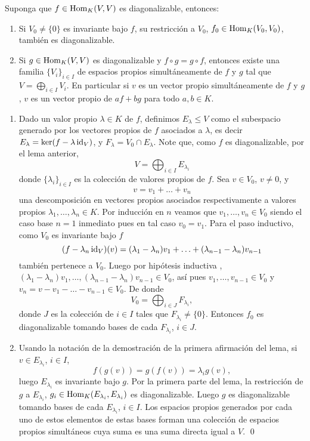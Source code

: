 \begin{lema}
Suponga que $f\in\operatorname{Hom}_K(V,V)$ es diagonalizable, entonces:
\begin{enumerate}
\item Si $V_0\ne\{0\}$ es invariante bajo $f$, su restricci\'on a $V_0$, $f_0\in\operatorname{Hom}_K(V_0,V_0)$, tambi\'en es diagonalizable. 
\item Si  $g\in\operatorname{Hom}_K(V,V)$ es diagonalizable y $f\circ g=g\circ f$, entonces existe una familia $\{V_i\}_{i\in I}$ de espacios propios simult\'aneamente de $f$ y $g$ tal que $V=\bigoplus_{i\in I}V_i$. En particular si $v$ es un vector propio simult\'aneamente de $f$ y $g$, $v$ es un vector propio de $af+bg$ para todo $a,b\in K$.
\end{enumerate}
\end{lema} 

\dem \begin{enumerate}
\item Dado un valor propio $\lambda\in K$ de $f$, definimos $E_\lambda\le V$ como el subespacio generado por los vectores propios de $f$ asociados a $\lambda$, es decir $E_\lambda=\ker(f-\lambda\operatorname{id}_V)$, y $F_\lambda=V_0\cap E_\lambda$. Note que, como $f$ es diagonalizable, por el lema anterior,
\[
V=\bigoplus_{i\in I} E_{\lambda_i}
\]
donde $\{\lambda_i\}_{i\in I}$ es la colecci\'on de valores propios de $f$. Sea $v\in V_0$, $v\ne 0$, y
\[
v=v_1+\ldots+v_n
\]
una descomposici\'on en vectores propios asociados respectivamente a valores propios $\lambda_1, \ldots , \lambda_n\in K$. Por inducci\'on en $n$ veamos que $v_1,\ldots,v_n\in V_0$ siendo el caso base $n=1$ inmediato pues en tal caso $v_0=v_1$. Para el paso inductivo, como $V_0$ es invariante bajo $f$
\[
(f-\lambda_n\operatorname{id}_V)(v)=(\lambda_1-\lambda_n)v_1+\ldots+(\lambda_{n-1}-\lambda_{n})v_{n-1}
\]
tambi\'en pertenece a $V_0$. Luego por hip\'otesis inductiva , $(\lambda_1-\lambda_n)v_1, \ldots, (\lambda_{n-1}-\lambda_{n})v_{n-1}\in V_0$, as\'i pues $v_1, \ldots, v_{n-1}\in V_0$ y $v_n=v-v_1-\ldots-v_{n-1}\in V_0$. De donde
\[
V_0=\bigoplus_{i\in J} F_{\lambda_i},
\]
donde $J$ es la colecci\'on de $i\in I$ tales que $F_{\lambda_i}\ne\{0\}$. Entonces $f_0$ es diagonalizable tomando bases de cada $F_{\lambda_i}$, $i\in J$.
\item Usando la notaci\'on de la demostraci\'on de la primera afirmaci\'on del lema, si $v\in E_{\lambda_i}$, $i\in I$,
\[
f\left(g(v)\right)=g\left(f(v)\right)=\lambda_ig(v),
\]
luego $E_{\lambda_i}$ es invariante bajo $g$. Por la primera parte del lema, la restricci\'on de $g$ a $E_{\lambda_i}$, $g_i\in\operatorname{Hom}_K (E_{\lambda_i},E_{\lambda_i})$ es diagonalizable. Luego $g$ es diagonalizable tomando bases de cada $E_{\lambda_i}$, $i\in I$. Los espacios propios generados por cada uno de estos elementos de estas bases forman una colecci\'on de espacios propios simult\'aneos cuya suma es una suma directa igual a $V$. \qed 
\end{enumerate}   


